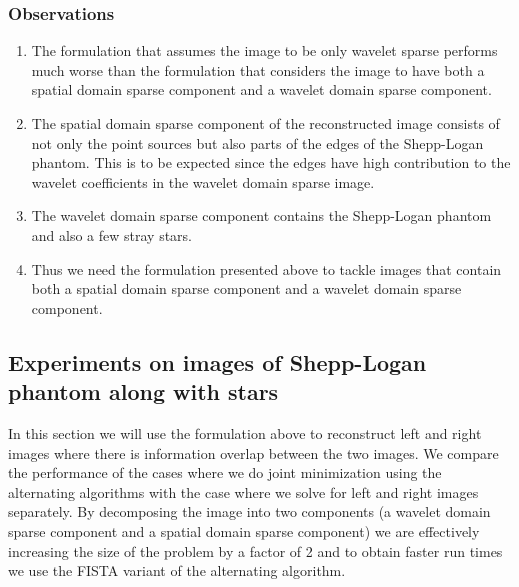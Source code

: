 \subsubsection{Observations}
\begin{enumerate}
\item The formulation that assumes the image to be only wavelet sparse performs much worse than the formulation that considers the image to have both a spatial domain sparse component and a wavelet domain sparse component.
\item The spatial domain sparse component of the reconstructed image consists of not only the point sources but also parts of the edges of the Shepp-Logan phantom. This is to be expected since the edges have high contribution to the wavelet coefficients in the wavelet domain sparse image.
\item The wavelet domain sparse component contains the Shepp-Logan phantom and also a few stray stars.
\item Thus we need the formulation presented above to tackle images that contain both a spatial domain sparse component and a wavelet domain sparse component.
\end{enumerate}

\subsection{Experiments on images of Shepp-Logan phantom along with stars}
In this section we will use the formulation above to reconstruct left and right images where there is information overlap between the two images. We compare the performance of the cases where we do joint minimization using the alternating algorithms with the case where we solve for left and right images separately. By decomposing the image into two components (a wavelet domain sparse component and a spatial domain sparse component) we are effectively increasing the size of the problem by a factor of 2 and to obtain faster run times we use the FISTA variant of the alternating algorithm.
